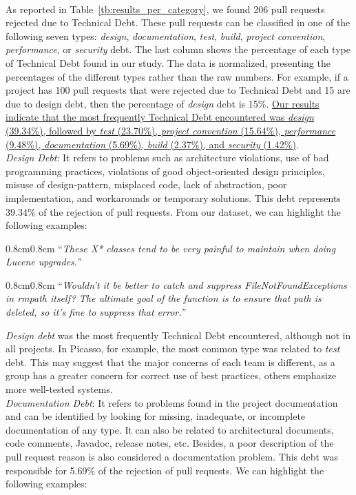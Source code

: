 \documentclass{sig-alternate}
\newcommand{\aspas}[1]{{``#1''}}
\newcommand{\frase}[2]{%
\noindent
\begin{center}
\begin{adjustwidth}{0.8cm}{0.8cm}
\aspas{\em #1}\\[0.1cm]
\hspace*{\fill}{({\em#2})}
\vspace{5pt}
\end{adjustwidth}
\end{center}
}
\begin{document}
\rqiii\\[-0.2cm]

As reported in Table~\ref{tb:results_per_category}, we found 206 pull requests rejected due to Technical Debt. These pull requests can be classified in one of the following seven types: {\em design}, {\em documentation}, {\em test}, {\em build}, {\em project convention}, {\em performance}, or {\em security} debt.  The last column shows the percentage of each type of Technical Debt found in our study. The data is normalized, presenting the percentages of the different types rather than the raw numbers. For example, if a project has 100 pull requests that were rejected due to Technical Debt and 15 are due to design debt, then the percentage of {\em design} debt is 15\%.
\ul{Our results indicate that the most frequently Technical Debt encountered was \textit{design} (39.34\%), followed by
\textit{test} (23.70\%), 
\textit{project convention} (15.64\%), 
\textit{performance} (9.48\%), 
\textit{documentation} (5.69\%),
\textit{build} (2.37\%), and
\textit{security} (1.42\%)}.\\





{\noindent \em Design Debt}: It refers to problems such as architecture violations, use of bad programming practices, violations of good object-oriented design principles, misuse of design-pattern, misplaced code, lack of abstraction, poor implementation, and workarounds or temporary solutions. {This debt represents 39.34\% of the rejection of pull requests}. From our dataset, we can highlight the following examples:

\frase{These X* classes tend to be very painful to maintain when doing Lucene upgrades.}{Elastic Search}



\frase{Wouldn't it be better to catch and suppress FileNotFoundExceptions in rmpath itself? The ultimate goal of the function is to ensure that path is deleted, so it's fine to suppress that error.}{Storm}

{\em Design debt} was the most frequently Technical Debt encountered, although not in all projects. In Picasso, for example, the most common type was related to {\em test} debt. This may suggest that the major concerns of each team is different, as a group has a greater concern for correct use of best practices, others emphasize more well-tested systems.\\

{\noindent \em Documentation Debt}: It refers to problems found in the project documentation and can be identified by looking for missing, inadequate, or incomplete documentation of any type. It can also be related to architectural documents, code comments, Javadoc, release notes, etc. Besides, a poor description of the pull request reason is also considered a documentation problem. 
{This debt was responsible for 5.69\% of the rejection of pull requests}. We can highlight the following examples:
\end{document}
